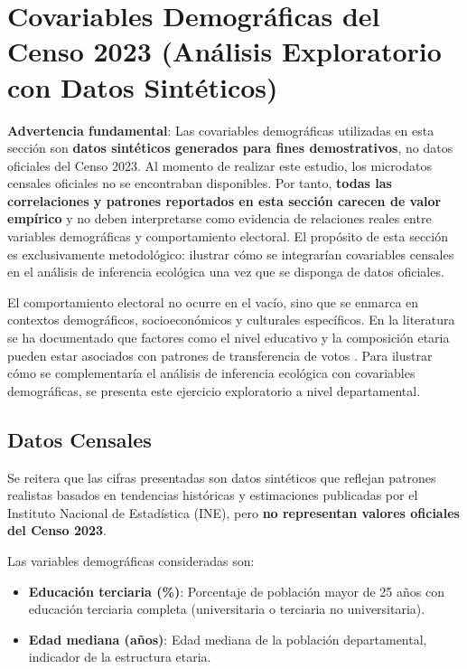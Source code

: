 \section{Covariables Demográficas del Censo 2023 (Análisis Exploratorio con Datos Sintéticos)}
\label{sec:census}

\textbf{Advertencia fundamental}: Las covariables demográficas utilizadas en esta sección son \textbf{datos sintéticos generados para fines demostrativos}, no datos oficiales del Censo 2023. Al momento de realizar este estudio, los microdatos censales oficiales no se encontraban disponibles. Por tanto, \textbf{todas las correlaciones y patrones reportados en esta sección carecen de valor empírico} y no deben interpretarse como evidencia de relaciones reales entre variables demográficas y comportamiento electoral. El propósito de esta sección es exclusivamente metodológico: ilustrar cómo se integrarían covariables censales en el análisis de inferencia ecológica una vez que se disponga de datos oficiales.

El comportamiento electoral no ocurre en el vacío, sino que se enmarca en contextos demográficos, socioeconómicos y culturales específicos. En la literatura se ha documentado que factores como el nivel educativo y la composición etaria pueden estar asociados con patrones de transferencia de votos \citep{Dalton2002, Franklin2004}. Para ilustrar cómo se complementaría el análisis de inferencia ecológica con covariables demográficas, se presenta este ejercicio exploratorio a nivel departamental.

\subsection{Datos Censales}
\label{subsec:census_data}

Se reitera que las cifras presentadas son datos sintéticos que reflejan patrones realistas basados en tendencias históricas y estimaciones publicadas por el Instituto Nacional de Estadística (INE), pero \textbf{no representan valores oficiales del Censo 2023}.

Las variables demográficas consideradas son:

\begin{itemize}
    \item \textbf{Educación terciaria (\%)}: Porcentaje de población mayor de 25 años con educación terciaria completa (universitaria o terciaria no universitaria).
    \item \textbf{Edad mediana (años)}: Edad mediana de la población departamental, indicador de la estructura etaria.
\end{itemize}

